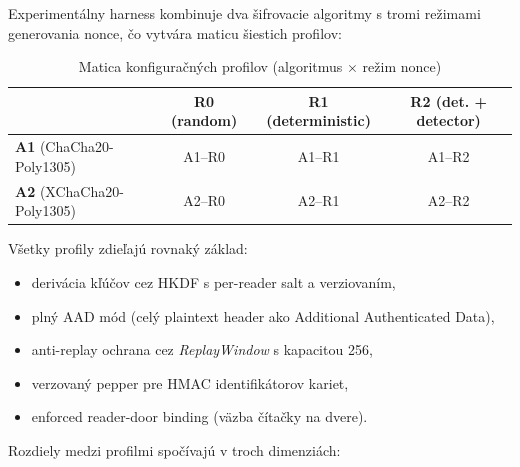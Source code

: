 Experimentálny harness kombinuje dva šifrovacie algoritmy s tromi režimami generovania nonce, čo vytvára maticu šiestich profilov:

\begin{table}[htbp]
\renewcommand{\arraystretch}{1.3}
\centering
\caption{Matica konfiguračných profilov (algoritmus $\times$ režim nonce)}
\label{tab:profile_matrix}
\begin{tabular}{l c c c}
\toprule
& \textbf{R0} (random) & \textbf{R1} (deterministic) & \textbf{R2} (det. + detector) \\
\midrule
\textbf{A1} (ChaCha20-Poly1305) & A1--R0 & A1--R1 & A1--R2 \\
\textbf{A2} (XChaCha20-Poly1305) & A2--R0 & A2--R1 & A2--R2 \\
\bottomrule
\end{tabular}
\end{table}

\noindent Všetky profily zdieľajú rovnaký základ:

\begin{itemize}[leftmargin=*,itemsep=2pt]
  \item derivácia kľúčov cez HKDF s per-reader salt a verziovaním,
  \item plný AAD mód (celý plaintext header ako Additional Authenticated Data),
  \item anti-replay ochrana cez \emph{ReplayWindow} s kapacitou 256,
  \item verzovaný pepper pre HMAC identifikátorov kariet,
  \item enforced reader-door binding (väzba čítačky na dvere).
\end{itemize}

\noindent Rozdiely medzi profilmi spočívajú v troch dimenziách:

